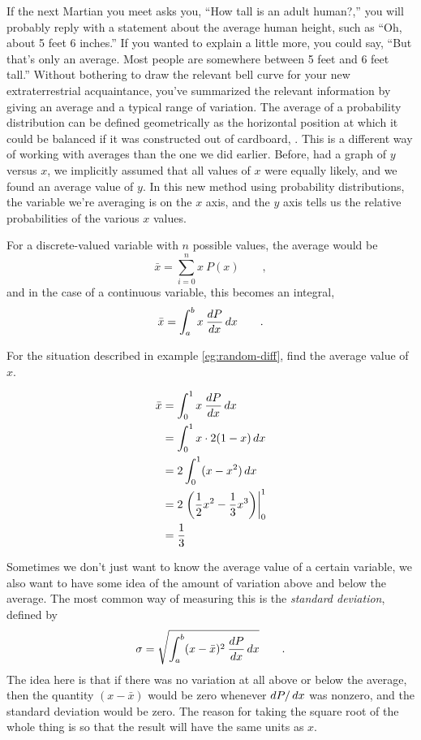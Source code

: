 If the next Martian you meet asks you, ``How tall is an
adult human?,'' you will probably reply with a statement
about the average human height, such as ``Oh, about 5 feet 6
inches.'' If you wanted to explain a little more, you could
say, ``But that's only an average. Most people are somewhere
between 5 feet and 6 feet tall.'' Without bothering to draw
the relevant bell curve for your new extraterrestrial
acquaintance, you've summarized the relevant information by
giving an average and a typical range of variation.
The average of a probability distribution can be defined
geometrically as the horizontal position at which it could
be balanced if it was constructed out of cardboard, .
This is a different way of working with averages than the one
we did earlier. Before, had a graph of $y$ versus $x$, we implicitly
assumed that all values of $x$ were equally likely, and we found an
average value of $y$. In this new method using probability distributions,
the variable we're averaging is on the $x$ axis, and the $y$ axis
tells us the relative probabilities of the various $x$ values.

For a discrete-valued variable with $n$ possible values, the average would be
\begin{equation*}
  \bar{x} = \sum_{i=0}^n x\:P(x) \qquad ,
\end{equation*}
and in the case of a continuous variable, this becomes an integral,
\begin{equation*}
  \bar{x} = \int_a^b x\:\frac{\mathop{d\!} P}{\mathop{d\!} x} \mathop{d\!} x \qquad .
\end{equation*}

\begin{eg}
\egquestion For the situation described in example \ref{eg:random-diff},
find the average value of $x$.

\eganswer
\begin{align*}
  \bar{x} &= \int_0^1 x\:\frac{\mathop{d\!} P}{\mathop{d\!} x} \mathop{d\!} x \\
          &= \int_0^1 x \cdot 2(1-x)\mathop{d\!} x \\
          &= 2\int_0^1 (x-x^2)\mathop{d\!} x \\
          &= 2\left. \left(\frac{1}{2}x^2-\frac{1}{3}x^3\right) \right|_0^1 \\
          &= \frac{1}{3}
\end{align*}
\end{eg}

Sometimes we don't just want to know the average value of a certain variable, we
also want to have some idea of the amount of variation above and below the average.
The most common way of measuring this is the \emph{standard deviation},
defined by
\begin{equation*}
  \sigma = \sqrt{\int_a^b (x-\bar{x})^2\:\frac{\mathop{d\!} P}{\mathop{d\!} x} \mathop{d\!} x} \qquad .
\end{equation*}
The idea here is that if there was no variation at all above or below the average,
then the quantity $(x-\bar{x})$ would be zero whenever $\mathop{d\!} P/\mathop{d\!} x$ was nonzero, and
the standard deviation would be zero. The reason for taking the square root of the whole
thing is so that the result will have the same units as $x$.

